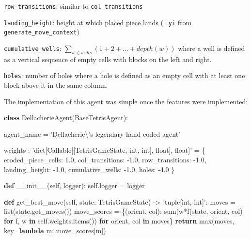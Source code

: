 \documentclass[11pt]{article}
\newenvironment{Shaded}{}{}
\newcommand{\KeywordTok}[1]{\textcolor[rgb]{0.00,0.44,0.13}{\textbf{{#1}}}}
\newcommand{\FloatTok}[1]{\textcolor[rgb]{0.25,0.63,0.44}{{#1}}}
\newcommand{\CharTok}[1]{\textcolor[rgb]{0.25,0.44,0.63}{{#1}}}
\newcommand{\StringTok}[1]{\textcolor[rgb]{0.25,0.44,0.63}{{#1}}}
\newcommand{\FunctionTok}[1]{\textcolor[rgb]{0.02,0.16,0.49}{{#1}}}
\newcommand{\NormalTok}[1]{{#1}}
\newcommand{\VariableTok}[1]{\textcolor[rgb]{0.10,0.09,0.49}{{#1}}}
\newcommand{\ControlFlowTok}[1]{\textcolor[rgb]{0.00,0.44,0.13}{\textbf{{#1}}}}
\newcommand{\OperatorTok}[1]{\textcolor[rgb]{0.40,0.40,0.40}{{#1}}}
\newcommand{\BuiltInTok}[1]{{#1}}
\begin{document}
\texttt{row\_transitions}: similar to \texttt{col\_transitions}

\texttt{landing\_height}: height at which placed piece lands
(=\texttt{yi} from \texttt{generate\_move\_context})

\texttt{cumulative\_wells}:
\(\sum_{w\in wells} (1 + 2 + ... + depth(w))\) where a well is defined
as a vertical sequence of empty cells with blocks on the left and right.

\texttt{holes}: number of holes where a hole is defined as an empty cell
with at least one block above it in the same column.

The implementation of this agent was simple once the features were
implemented:

\begin{Shaded}
\begin{Highlighting}[]
\KeywordTok{class}\NormalTok{ DellacherieAgent(BaseTetrisAgent):}

\NormalTok{    agent_name }\OperatorTok{=} \StringTok{'Dellacherie}\CharTok{\textbackslash{}'}\StringTok{s legendary hand coded agent'}

\NormalTok{    weights : }\StringTok{'dict[Callable[[TetrisGameState, int, int], float], float]'} \OperatorTok{=}\NormalTok{ \{}
\NormalTok{        eroded_piece_cells: }\FloatTok{1.0}\NormalTok{,}
\NormalTok{        col_transitions: }\FloatTok{-1.0}\NormalTok{,}
\NormalTok{        row_transitions: }\FloatTok{-1.0}\NormalTok{,}
\NormalTok{        landing_height: }\FloatTok{-1.0}\NormalTok{,}
\NormalTok{        cumulative_wells: }\FloatTok{-1.0}\NormalTok{,}
\NormalTok{        holes: }\FloatTok{-4.0}
\NormalTok{    \}}

    \KeywordTok{def} \FunctionTok{__init__}\NormalTok{(}\VariableTok{self}\NormalTok{, logger):}
        \VariableTok{self}\NormalTok{.logger }\OperatorTok{=}\NormalTok{ logger}

    \KeywordTok{def}\NormalTok{ get_best_move(}\VariableTok{self}\NormalTok{, state: TetrisGameState) }\OperatorTok{->} \StringTok{'tuple[int, int]'}\NormalTok{:}
\NormalTok{        moves }\OperatorTok{=} \BuiltInTok{list}\NormalTok{(state.get_moves())}
\NormalTok{        move_scores }\OperatorTok{=}\NormalTok{ \{(orient, col): }\BuiltInTok{sum}\NormalTok{(w}\OperatorTok{*}\NormalTok{f(state, orient, col) }\ControlFlowTok{for}\NormalTok{ f, w }\KeywordTok{in} \VariableTok{self}\NormalTok{.weights.items())}
            \ControlFlowTok{for}\NormalTok{ orient, col }\KeywordTok{in}\NormalTok{ moves\}}
        \ControlFlowTok{return} \BuiltInTok{max}\NormalTok{(moves, key}\OperatorTok{=}\KeywordTok{lambda}\NormalTok{ m: move_scores[m])}
\end{Highlighting}
\end{Shaded}
\end{document}
